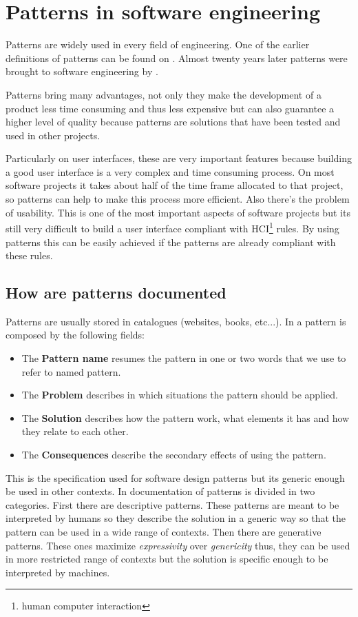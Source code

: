 \section{Patterns in software engineering}
Patterns are widely used in every field of engineering. One of the earlier definitions of patterns can be found on \cite{A_Pattern_Language_Towns_Buildings_Construction}. Almost twenty years later patterns were brought to software engineering by \cite{Design_Patterns}.

Patterns bring many advantages, not only they make the development of a product less time consuming and thus less expensive but can also guarantee a higher level of quality because patterns are solutions that have been tested and used in other projects.

Particularly on user interfaces, these are very important features because building a good user interface is a very complex and time consuming process. On most software projects it takes about half of the time frame allocated to that project, so patterns can help to make this process more efficient. Also there's the problem of usability. This is one of the most important aspects of software projects but its still very difficult to build a user interface compliant with HCI\footnote{human computer interaction} rules. By using patterns this can be easily achieved if the patterns are already compliant with these rules.

\subsection{How are patterns documented}
Patterns are usually stored in catalogues (websites, books, etc...). In \cite{Design_Patterns} a pattern is composed by the following fields:
\begin{itemize}
\item The \textbf{Pattern name} resumes the pattern in one or two words that we use to refer to named pattern.
\item The \textbf{Problem} describes in which situations the pattern should be applied.
\item The \textbf{Solution} describes how the pattern work, what elements it has and how they relate to each other.
\item The \textbf{Consequences} describe the secondary effects of using the pattern.
\end{itemize}
This is the specification used for software design patterns but its generic enough be used in other contexts.
In \cite{Generative_pattern-based_design_of_user_interfaces} documentation of patterns is divided in two categories. First there are descriptive patterns. These patterns are meant to be interpreted by humans so they describe the solution in a generic way so that the pattern can be used in a wide range of contexts. Then there are generative patterns. These ones maximize \textit{expressivity} over \textit{genericity} thus, they can be used in more restricted range of contexts but the solution is specific enough to be interpreted by machines. 

